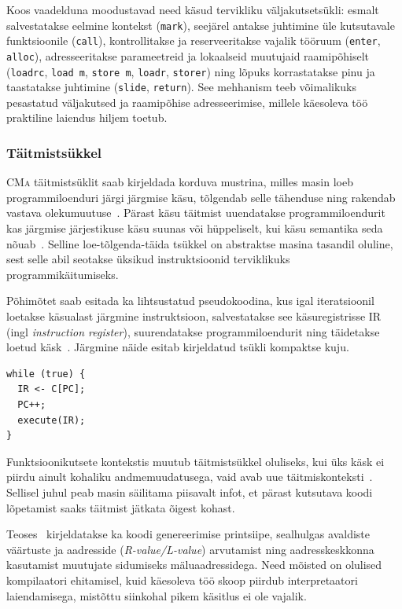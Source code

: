 Koos vaadelduna moodustavad need käsud tervikliku väljakutsetsükli: esmalt salvestatakse eelmine kontekst (\verb|mark|), seejärel antakse juhtimine üle kutsutavale funktsioonile (\verb|call|), kontrollitakse ja reserveeritakse vajalik tööruum (\verb|enter|, \verb|alloc|), adresseeritakse parameetreid ja lokaalseid muutujaid raamipõhiselt (\verb|loadrc|, \verb|load m|, \verb|store m|, \verb|loadr|, \verb|storer|) ning lõpuks korrastatakse pinu ja taastatakse juhtimine (\verb|slide|, \verb|return|). See mehhanism teeb võimalikuks pesastatud väljakutsed ja raamipõhise adresseerimise, millele käesoleva töö praktiline laiendus hiljem toetub.

\subsubsection{Täitmistsükkel}\label{taust:CMa:taitmistsukkel}

\textsc{CMa} täitmistsüklit saab kirjeldada korduva mustrina, milles masin loeb programmiloenduri järgi järgmise käsu, tõlgendab selle tähenduse ning rakendab vastava olekumuutuse~\cite{wilhelm_imperative_2010}. Pärast käsu täitmist uuendatakse programmiloendurit kas järgmise järjestikuse käsu suunas või hüppeliselt, kui käsu semantika seda nõuab~\cite{seidl_compiler_2012}. Selline loe-tõlgenda-täida tsükkel on abstraktse masina tasandil oluline, sest selle abil seotakse üksikud instruktsioonid terviklikuks programmikäitumiseks.

Põhimõtet saab esitada ka lihtsustatud pseudokoodina, kus igal iteratsioonil loetakse käsualast järgmine instruktsioon, salvestatakse see käsuregistrisse IR (ingl \emph{instruction register}), suurendatakse programmiloendurit ning täidetakse loetud käsk~\cite{wilhelm_imperative_2010}. Järgmine näide esitab kirjeldatud tsükli kompaktse kuju.

\begin{verbatim}
while (true) {
  IR <- C[PC];
  PC++;
  execute(IR);
}
\end{verbatim}

Funktsioonikutsete kontekstis muutub täitmistsükkel oluliseks, kui üks käsk ei piirdu ainult kohaliku andmemuudatusega, vaid avab uue täitmiskonteksti~\cite{mogensen_programming_2026}. Sellisel juhul peab masin säilitama piisavalt infot, et pärast kutsutava koodi lõpetamist saaks täitmist jätkata õigest kohast.

Teoses~\cite{wilhelm_imperative_2010} kirjeldatakse ka koodi genereerimise printsiipe, sealhulgas avaldiste väärtuste ja aadresside (\emph{R-value/L-value}) arvutamist ning aadresskeskkonna kasutamist muutujate sidumiseks mäluaadressidega. Need mõisted on olulised kompilaatori ehitamisel, kuid käesoleva töö skoop piirdub interpretaatori laiendamisega, mistõttu siinkohal pikem käsitlus ei ole vajalik.

